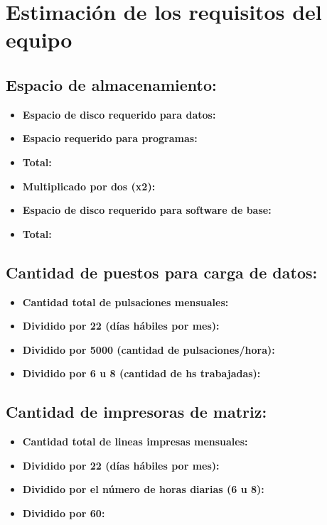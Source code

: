 \section{Estimación de los requisitos del equipo}

\subsection{Espacio de almacenamiento:}
\begin{itemize}
  \item \textbf{Espacio de disco requerido para datos:}
  \item \textbf{Espacio requerido para programas:}
  \item \textbf{Total:}
  \item \textbf{Multiplicado por dos (x2):}
  \item \textbf{Espacio de disco requerido para software de base:}
  \item \textbf{Total:}
\end{itemize}

\subsection{Cantidad de puestos para carga de datos:}
\begin{itemize}
  \item \textbf{Cantidad total de pulsaciones mensuales:}
  \item \textbf{Dividido por 22 (días hábiles por mes):}
  \item \textbf{Dividido por 5000 (cantidad de pulsaciones/hora):}
  \item \textbf{Dividido por 6 u 8 (cantidad de hs trabajadas):}
\end{itemize}

\subsection{Cantidad de impresoras de matriz:}
\begin{itemize}
  \item \textbf{Cantidad total de lineas impresas mensuales:}
  \item \textbf{Dividido por 22 (días hábiles por mes):}
  \item \textbf{Dividido por el número de horas diarias (6 u 8):}
  \item \textbf{Dividido por 60:}
\end{itemize}

